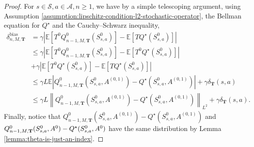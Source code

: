 \documentclass[11pt]{article}
\numberwithin{equation}{section}
\theoremstyle{definition}
\theoremstyle{remark}
\begin{document}
\begin{proof}
    For $s \in \mathcal S, a \in \mathcal A, n \geq 1$, we have by a simple telescoping argument, using Assumption \ref{assumption:lipschitz-condition-l2-stochastic-operator}, the Bellman equation for  $Q^\star$  and the Cauchy--Schwarz inequality,
    \begin{equation*}
        \label{eq:bias-error}
        \begin{aligned}
            \delta ^{\text{bias}}_{n,M, \mathbf T} & = \gamma \left| \mathbb E \left[T^0Q_{n-1,M,\mathbf T}^{0}\left(S^0_{s,a}\right) \right] - \mathbb E \left[ TQ ^{\star}\left(S_{s,a}^0\right)\right] \right|        \\
      & \leq \gamma \left| \mathbb E \left[ T^0Q_{n-1,M,\mathbf T}^{0}\left(S^0_{s,a}\right) \right] - \mathbb E \left[ T^0Q ^{\star}\left(S^0_{s,a}\right)\right] \right|    \\  
      & + \gamma \left| \mathbb E \left[ T^0Q^\star \left(S^0_{s,a}\right) \right] - \mathbb E \left[TQ ^{\star}\left(S^0_{s,a}\right)\right] \right|                                 \\
                     & \leq \gamma L  \mathbb E \left|Q^0_{n-1,M,\mathbf T} \left(S^0_{s,a}, A^{(0,1)} \right) - Q^\star \left(S^0_{s,a}, A^{(0,1)}\right)\right|  + \gamma \delta_{\mathbf T} (s,a) \\
                    & \leq \gamma L  \left\| Q^0_{n-1,M,\mathbf T} \left(S^0_{s,a}, A^{(0, 1)}\right) - Q^\star \left(S^0_{s,a}, A^{(0,1)}\right) \right\|_{L^2} + \gamma \delta_{\mathbf T}(s,a).
        \end{aligned}
    \end{equation*}
    Finally, notice that $Q^0_{n-1,M,\mathbf T} (S^0_{s,a}, A^{(0, 1)}) - Q^\star (S^0_{s,a}, A^{(0,1)})$ and $Q^0_{n-1,M,\mathbf T} (S^0_{s,a}, A^{0}) - \\ Q^\star (S^0_{s,a}, A^{0})$ have the same distribution by Lemma \ref{lemma:theta-is-just-an-index}.
\end{proof}
\end{document}
